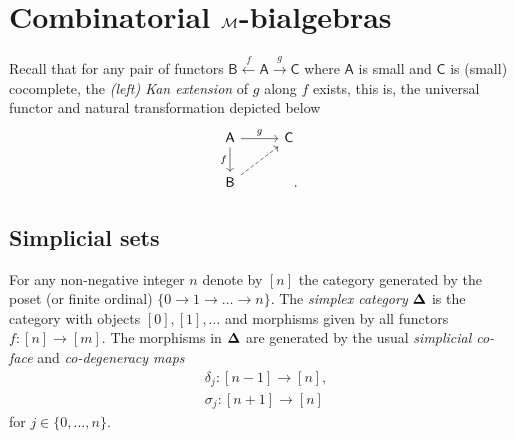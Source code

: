 \section{Combinatorial $\mathcal{M}$-bialgebras}

Recall that for any pair of functors $\mathsf{B} \stackrel{f}{\leftarrow} \mathsf{A} \stackrel{g}{\to} \mathsf{C}$ where $\mathsf{A}$ is small and $\mathsf{C}$ is (small) cocomplete, the \textit{(left) Kan extension} of $g$ along $f$ exists, this is, the universal functor and natural transformation depicted below
\begin{equation*}
\begin{tikzcd}
\mathsf{A} \arrow[d, "f"'] \arrow[r, "g"] & \mathsf{C} \\
\mathsf{B} \arrow[dashed, ur] & \quad .
\end{tikzcd}
\end{equation*}

\subsection{Simplicial sets}

For any non-negative integer $n$ denote by $[n]$ the category generated by the poset (or finite ordinal) $\{0 \to 1 \to \dots \to n\}$.
The \textit{simplex category} $\mathbf{\Delta}$ is the category with objects $[0], [1], \dots$ and morphisms given by all functors $f \colon [n] \to [m]$.
The morphisms in $\mathbf{\Delta}$ are generated by the usual
\textit{simplicial co-face} and \textit{co-degeneracy maps}
\begin{align*}
& \delta_j \colon [n-1] \to [n], \\
& \sigma_j \colon [n+1] \to [n]
\end{align*}
for $j \in \{0, \dots, n\}$.


